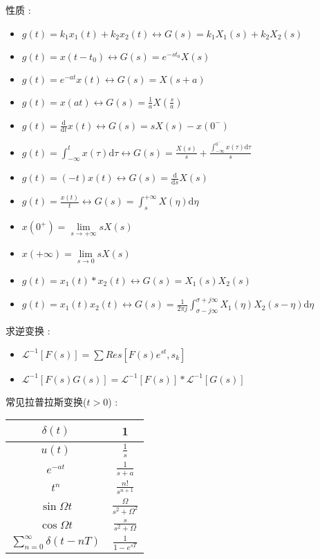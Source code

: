 \documentclass[UTF8, 12pt]{ctexart}
\begin{document}
		性质 : 
		\begin{itemize}[leftmargin = 4em]
			\item $ g(t) = k_{1}x_{1}(t)+k_{2}x_{2}(t) \leftrightarrow G(s) = k_{1}X_{1}(s)+k_{2}X_{2}(s) $
			\item $ g(t) = x(t-t_{0}) \leftrightarrow G(s) = e^{-st_{0}}X(s) $
			\item $ g(t) = e^{-at}x(t) \leftrightarrow G(s) = X(s+a) $
			\item $ g(t) = x(at) \leftrightarrow G(s) = \frac{1}{a}X(\frac{s}{a}) $
			\item $ g(t) = \frac{\mathrm{d}}{\mathrm{d}t}x(t) \leftrightarrow G(s) = sX(s)-x(0^{-}) $
			\item $ g(t) = \int_{-\infty}^{t}x(\tau)\mathrm{d}\tau \leftrightarrow G(s) = \frac{X(s)}{s} + \frac{\int_{-\infty}^{0^{-}}x(\tau)\mathrm{d}\tau}{s} $
			\item $ g(t) = (-t)x(t) \leftrightarrow G(s) = \frac{\mathrm{d}}{\mathrm{d}s}X(s) $
			\item $ g(t) = \frac{x(t)}{t} \leftrightarrow G(s) = \int_{s}^{+\infty}X(\eta)\mathrm{d}\eta $
			\item $ x(0^{+}) = \lim\limits_{s \to +\infty}sX(s) $
			\item $ x(+\infty) = \lim\limits_{s \to 0}sX(s) $
			\item $ g(t) = x_{1}(t)*x_{2}(t) \leftrightarrow G(s) = X_{1}(s)X_{2}(s) $
			\item $ g(t) = x_{1}(t)x_{2}(t) \leftrightarrow G(s) = \frac{1}{2\pi j}\int_{\sigma-j\infty}^{\sigma+j\infty}X_{1}(\eta)X_{2}(s-\eta)\mathrm{d}\eta $
		\end{itemize}

		求逆变换 :
		\begin{itemize}[leftmargin = 4em]
			\item $ \mathscr{L}^{-1}[F(s)] = \sum Res[F(s)e^{st}, s_k] $
			\item $ \mathscr{L}^{-1}[F(s)G(s)] = \mathscr{L}^{-1}[F(s)] * \mathscr{L}^{-1}[G(s)] $
		\end{itemize}

		常见拉普拉斯变换($ t > 0 $) : 
		\begin{table}[ht]
			\begin{tabular}{|c|c|}
				\hline
				$ \delta(t) $ & 1 \\ \hline
				$ u(t) $ & $ \frac{1}{s} $ \\ \hline
				$ e^{-at} $ & $ \frac{1}{s+a} $ \\ \hline
				$ t^{n} $ & $ \frac{n!}{s^{n+1}} $ \\ \hline
				$ \sin\Omega t $ & $ \frac{\Omega}{s^{2}+\Omega^{2}} $ \\ \hline
				$ \cos\Omega t $ & $ \frac{s}{s^{2}+\Omega^{}} $ \\ \hline
				$ \sum\limits_{n=0}^{\infty}\delta(t-nT) $ & $ \frac{1}{1-e^{sT}} $ \\ \hline
			\end{tabular}
		\end{table}
\end{document}
